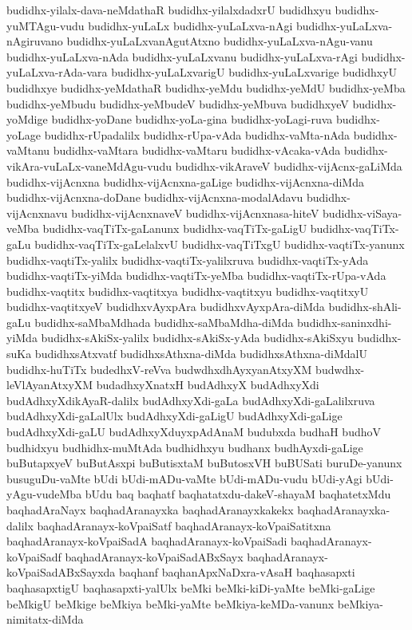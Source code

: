 {budidhx-yilalx-dava-neMdathaR
budidhx-yilalxdadxrU
budidhxyu
budidhx-yuMTAgu-vudu
budidhx-yuLaLx
budidhx-yuLaLxva-nAgi
budidhx-yuLaLxva-nAgiruvano
budidhx-yuLaLxvanAgutAtxno
budidhx-yuLaLxva-nAgu-vanu
budidhx-yuLaLxva-nAda
budidhx-yuLaLxvanu
budidhx-yuLaLxva-rAgi
budidhx-yuLaLxva-rAda-vara
budidhx-yuLaLxvarigU
budidhx-yuLaLxvarige
budidhxyU
budidhxye
budidhx-yeMdathaR
budidhx-yeMdu
budidhx-yeMdU
budidhx-yeMba
budidhx-yeMbudu
budidhx-yeMbudeV
budidhx-yeMbuva
budidhxyeV
budidhx-yoMdige
budidhx-yoDane
budidhx-yoLa-gina
budidhx-yoLagi-ruva
budidhx-yoLage
budidhx-rUpadalilx
budidhx-rUpa-vAda
budidhx-vaMta-nAda
budidhx-vaMtanu
budidhx-vaMtara
budidhx-vaMtaru
budidhx-vAcaka-vAda
budidhx-vikAra-vuLaLx-vaneMdAgu-vudu
budidhx-vikAraveV
budidhx-vijAcnx-gaLiMda
budidhx-vijAcnxna
budidhx-vijAcnxna-gaLige
budidhx-vijAcnxna-diMda
budidhx-vijAcnxna-doDane
budidhx-vijAcnxna-modalAdavu
budidhx-vijAcnxnavu
budidhx-vijAcnxnaveV
budidhx-vijAcnxnasa-hiteV
budidhx-viSaya-veMba
budidhx-vaqTiTx-gaLanunx
budidhx-vaqTiTx-gaLigU
budidhx-vaqTiTx-gaLu
budidhx-vaqTiTx-gaLelalxvU
budidhx-vaqTiTxgU
budidhx-vaqtiTx-yanunx
budidhx-vaqtiTx-yalilx
budidhx-vaqtiTx-yalilxruva
budidhx-vaqtiTx-yAda
budidhx-vaqtiTx-yiMda
budidhx-vaqtiTx-yeMba
budidhx-vaqtiTx-rUpa-vAda
budidhx-vaqtitx
budidhx-vaqtitxya
budidhx-vaqtitxyu
budidhx-vaqtitxyU
budidhx-vaqtitxyeV
budidhxvAyxpAra
budidhxvAyxpAra-diMda
budidhx-shAli-gaLu
budidhx-saMbaMdhada
budidhx-saMbaMdha-diMda
budidhx-saninxdhi-yiMda
budidhx-sAkiSx-yalilx
budidhx-sAkiSx-yAda
budidhx-sAkiSxyu
budidhx-suKa
budidhxsAtxvatf
budidhxsAthxna-diMda
budidhxsAthxna-diMdalU
budidhx-huTiTx
budedhxV-reVva
budwdhxdhAyxyanAtxyXM
budwdhx-leVlAyanAtxyXM
budadhxyXnatxH
budAdhxyX
budAdhxyXdi
budAdhxyXdikAyaR-dalilx
budAdhxyXdi-gaLa
budAdhxyXdi-gaLalilxruva
budAdhxyXdi-gaLalUlx
budAdhxyXdi-gaLigU
budAdhxyXdi-gaLige
budAdhxyXdi-gaLU
budAdhxyXduyxpAdAnaM
budubxda
budhaH
budhoV
budhidxyu
budhidhx-muMtAda
budhidhxyu
budhanx
budhAyxdi-gaLige
buButapxyeV
buButAsxpi
buButisxtaM
buButosxVH
buBUSati
buruDe-yanunx
busuguDu-vaMte
bUdi
bUdi-mADu-vaMte
bUdi-mADu-vudu
bUdi-yAgi
bUdi-yAgu-vudeMba
bUdu
baq
baqhatf
baqhatatxdu-dakeV-shayaM
baqhatetxMdu
baqhadAraNayx
baqhadAranayxka
baqhadAranayxkakekx
baqhadAranayxka-dalilx
baqhadAranayx-koVpaiSatf
baqhadAranayx-koVpaiSatitxna
baqhadAranayx-koVpaiSadA
baqhadAranayx-koVpaiSadi
baqhadAranayx-koVpaiSadf
baqhadAranayx-koVpaiSadABxSayx
baqhadAranayx-koVpaiSadABxSayxda
baqhanf
baqhanApxNaDxra-vAsaH
baqhasapxti
baqhasapxtigU
baqhasapxti-yalUlx
beMki
beMki-kiDi-yaMte
beMki-gaLige
beMkigU
beMkige
beMkiya
beMki-yaMte
beMkiya-keMDa-vanunx
beMkiya-nimitatx-diMda
}
